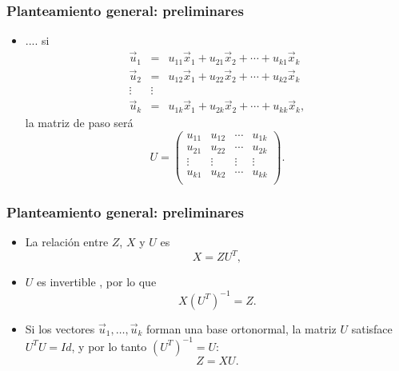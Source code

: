 \documentclass{beamer}
\begin{document}
      \begin{frame}\frametitle{Planteamiento general: preliminares}
    \begin{itemize}
    \item ....   si
\begin{eqnarray*}
\vec{u}_1&=&u_{11}\vec{x}_1+u_{21}\vec{x}_2+\cdots+u_{k1}\vec{x}_k\\
\vec{u}_2&=&u_{12}\vec{x}_1+u_{22}\vec{x}_2+\cdots+u_{k2}\vec{x}_k\\
\vdots&\vdots\\
\vec{u}_k&=&u_{1k}\vec{x}_1+u_{2k}\vec{x}_2+\cdots+u_{kk}\vec{x}_k,
\end{eqnarray*}
la matriz de paso será\vspace{-0.2cm} 
$$\label{paso}U=\left(\begin{array}{llll}
u_{11}&u_{12}&\cdots&u_{1k}\\
u_{21}&u_{22}&\cdots&u_{2k}\\
\vdots&\vdots&\vdots&\vdots\\
u_{k1}&u_{k2}&\cdots&u_{kk}\\
\end{array}\right).$$
    \end{itemize}
    
 \end{frame}
        \begin{frame}\frametitle{Planteamiento general: preliminares}
    \begin{itemize}
    \item<+-> La relación entre  $Z$, $X$ y $U$ es 
\begin{equation*}
X=ZU^T,
\end{equation*}
\item<+-> $U$ es invertible , por lo que 
\begin{equation*}
X(U^T)^{-1}=Z.
\end{equation*}
\item<+->  Si los vectores $\vec{u}_1,\ldots,\vec{u}_k$ forman una base ortonormal, la matriz $U$ satisface $U^TU=Id$, y por lo tanto $(U^T)^{-1}=U$: $$Z=XU.$$
    \end{itemize}
    
 \end{frame}
\end{document}
